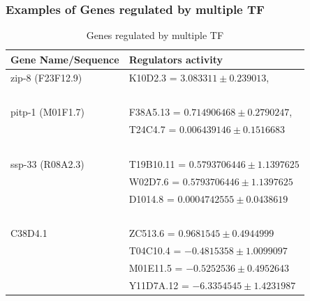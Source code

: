\documentclass{beamer}
\begin{document}
\begin{frame}
\frametitle{Examples of Genes regulated by multiple TF}
\begin{table}
\begin{tabular}{l l }
\toprule
\textbf{Gene Name/Sequence} & \textbf{Regulators activity} \\
\midrule

{\color{red} zip-8 (F23F12.9)} & {\color{blue} K10D2.3 }= $ 3.083311 \pm 0.239013 $, \\~\\ 


{\color{red} pitp-1 (M01F1.7)} & {\color{blue} F38A5.13 }= $ 0.714906468 \pm 0.2790247 $, \\ 
		       & {\color{blue} T24C4.7} = $ 0.006439146 \pm 0.1516683 $ \\~\\


{\color{red} ssp-33 (R08A2.3)} & {\color{blue} T19B10.11} = $ 0.5793706446 \pm 1.1397625 $ \\
		  & {\color{blue} W02D7.6} = $ 0.5793706446 \pm 1.1397625 $ \\
 		  & {\color{blue} D1014.8} = $ 0.0004742555 \pm  0.0438619 $\\~\\

{\color{red} C38D4.1} & {\color{blue} ZC513.6} = $ 0.9681545 \pm  0.4944999 $ \\
		  & {\color{blue} T04C10.4 } = $ -0.4815358 \pm  1.0099097 $ \\
 		  & {\color{blue} M01E11.5 } = $ -0.5252536 \pm  0.4952643 $ \\
		  & {\color{blue} Y11D7A.12 } = $ -6.3354545 \pm 1.4231987 $ \\
\bottomrule
\end{tabular}
\caption{Genes regulated by multiple TF}
\end{table}
\end{frame}


\end{document}
